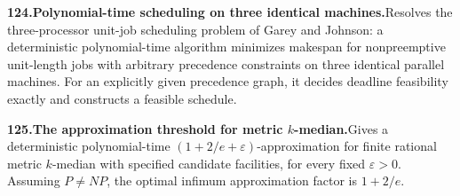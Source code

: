 \documentclass[11pt,a4paper]{article}
\begin{document}
  \par \begin{minipage}{\linewidth}
  \fontsize{10.5}{12.6}\selectfont\RaggedRight
  \hypertarget{result 124}{}
  {\bfseries\textcolor{muted}{124.}\enspace Polynomial-time scheduling on three identical machines.}\enspace Resolves the three-processor unit-job scheduling problem of Garey and Johnson: a deterministic polynomial-time algorithm minimizes makespan for nonpreemptive unit-length jobs with arbitrary precedence constraints on three identical parallel machines. For an explicitly given precedence graph, it decides deadline feasibility exactly and constructs a feasible schedule.\par
  \end{minipage}\par\vspace{5pt}



  \par \begin{minipage}{\linewidth}
  \fontsize{10.5}{12.6}\selectfont\RaggedRight
  \hypertarget{result 125}{}
  {\bfseries\textcolor{muted}{125.}\enspace The approximation threshold for metric $k$-median.}\enspace Gives a deterministic polynomial-time $(1+2/e+\varepsilon)$-approximation for finite rational metric $k$-median with specified candidate facilities, for every fixed $\varepsilon>0$. Assuming $P\ne NP$, the optimal infimum approximation factor is $1+2/e$.\par
  \end{minipage}\par\vspace{5pt}
\end{document}
